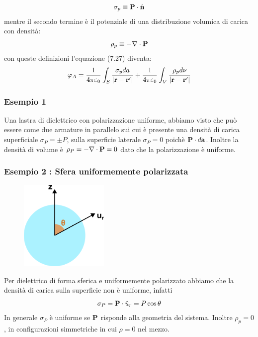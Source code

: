 \begin{equation}
	\sigma_{p} \equiv \bold{P} \cdot \hat{\bold{n}} 
\end{equation}
mentre il secondo termine \`e il potenziale di una distribuzione volumica di carica con densit\`a:
\begin{equation}
	\rho_{p} \equiv - \nabla \cdot \bold{P}
\end{equation}
con queste definizioni l'equazione (7.27) diventa:
\begin{equation}
	\varphi_{A} = \frac{1}{4 \pi \varepsilon_0} \int_{S} \frac{\sigma_{p} da}{|\bold{r} - \bold{r}'|} + \frac{1}{4 \pi \varepsilon_0} \int_{V} \frac{\rho_{p} d \nu}{|\bold{r} - \bold{r}'|}
\end{equation}

\subsubsection{Esempio 1}
Una lastra di dielettrico con polarizzazione uniforme, abbiamo visto che pu\`o essere come due armature in parallelo sui cui \`e presente una densit\`a di carica superficiale $\sigma_{P} = \pm P$, sulla superficie laterale $\sigma_{P} = 0$ poich\`e $\bold{P} \cdot d \bold{a} $. Inoltre la densit\`a di volume \`e $\rho_{P} = - \nabla \cdot \bold{P} = 0$ dato che la polarizzazione \`e uniforme.
\newpage 

\subsubsection{Esempio 2 : Sfera uniformemente polarizzata}

\begin{figure} %
    \centering
    \includegraphics[width=0.38\textwidth]{images/dielsphere} %
\end{figure}

Per dielettrico di forma sferica e uniformemente polarizzato abbiamo che la densit\`a di carica sulla superficie non \`e uniforme, infatti
\begin{equation*}
	\sigma_{P} = \bold{P} \cdot \hat{u}_{r} = P\cos\theta
\end{equation*}
In generale $\sigma_{P}$ \`e uniforme se $\bold{P}$ risponde alla geometria del sistema. Inoltre $\rho_{p} = 0$, in configurazioni simmetriche in cui $\rho =0$ nel mezzo.

